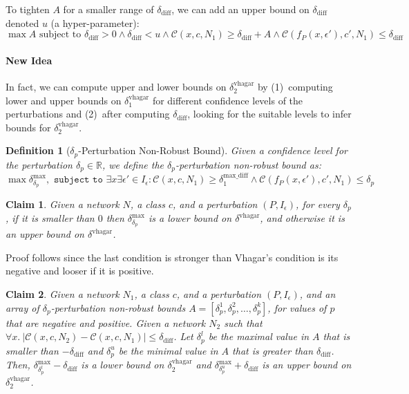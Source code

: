 \documentclass[11pt]{article}
\newtheorem{definition}{Definition}
\newtheorem{claim}{Claim}
\begin{document}
  To tighten $A$ for a smaller range of $\delta_\text{diff}$, we can add an upper bound on $\delta_\text{diff}$ denoted $u$ (a hyper-parameter):
  \begin{equation}\label{eq:ourproof}
 \max A \text{ subject to } \delta_\text{diff}>0\land \delta_\text{diff}<u\land \mathcal{C}(x,c,N_1) \geq \delta_\text{diff} + A\land \mathcal{C}(f_P(x,\epsilon'),c',N_1)\leq \delta_\text{diff}
 \end{equation}
 \paragraph{New Idea}
 In fact, we can compute upper and lower bounds on $\delta^\text{vhagar}_2$ by (1)~computing lower and upper bounds on  $\delta^\text{vhagar}_1$ for different confidence levels of the perturbations and (2)~after computing $\delta_\text{diff}$, looking for the suitable levels to infer bounds for $\delta^\text{vhagar}_2$.
 \begin{definition}[$\delta_p$-Perturbation Non-Robust Bound]
 Given a confidence level for the perturbation $\delta_p\in\mathbb{R}$, we define the $\delta_p$-perturbation non-robust bound as:  
\begin{equation}\label{eq:vagbound}
\max{\delta^\text{max}_{\delta_p}}, \texttt{ subject to } \exists{x}\exists{\epsilon'}\in{I_\epsilon}: \mathcal{C}(x,c,N_1) \geq \delta^\text{max\_diff}_1 \land \mathcal{C}(f_P(x,\epsilon'),c',N_1)\leq \delta_p
\end{equation}
\end{definition}
\begin{claim}\label{claim:n1}
Given a network $N$, a class $c$, and a perturbation $(P,I_\epsilon)$,
  for every $\delta_p$, if it is smaller than $0$ then ${\delta^\text{max}_{\delta_p}}$ is a lower bound on $\delta^\text{vhagar}$, and otherwise it is an upper bound on  $\delta^\text{vhagar}$. 
\end{claim}
Proof follows since the last condition is stronger than Vhagar's condition is its negative and looser if it is positive.
 \begin{claim}
 Given a network $N_1$, a class $c$, and a perturbation $(P,I_\epsilon)$,
 and an array of $\delta_p$-perturbation non-robust bounds $A=[\delta^1_p,\delta^2_p,\ldots,\delta_p^k]$, for values of $p$ that are negative and positive. Given a network $N_2$ such that  $\forall x.\ |\mathcal{C}(x,c,N_2)-\mathcal{C}(x,c,N_1)|\leq \delta_\text{diff}$. Let $\delta^l_p$ be the maximal value in $A$ that is smaller than $-\delta_\text{diff}$ and $\delta^u_p$ be the minimal value in $A$ that is greater than $\delta_\text{diff}$. Then, ${\delta^\text{max}_{\delta^l_p}}-\delta_\text{diff}$ is a lower bound on  $\delta^\text{vhagar}_2$ and 
 ${\delta^\text{max}_{\delta^u_p}}+\delta_\text{diff}$ is an upper bound on  $\delta^\text{vhagar}_2$.
 \end{claim}
\end{document}
